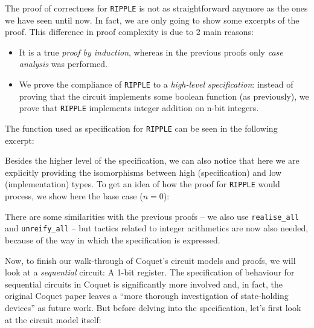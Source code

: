             The proof of correctness for \texttt{RIPPLE} is not as straightforward anymore as the
            ones we have seen until now. In fact, we are only going to show some excerpts of the
            proof. This difference in proof complexity is due to 2 main reasons:

            \begin{itemize}
                \item It is a true \emph{proof by induction}, whereas in the previous proofs only
                    \emph{case analysis} was performed.
                \item We prove the compliance of \texttt{RIPPLE} to a \emph{high-level
                        specification}: instead of proving that the circuit implements some boolean
                    function (as previously), we prove that \texttt{RIPPLE} implements integer
                    addition on n-bit integers.
            \end{itemize}

            The function used as specification for \texttt{RIPPLE} can be seen in the following
            excerpt:


            Besides the higher level of the specification, we can also notice that here we are
            explicitly providing the isomorphisms between high (specification) and low
            (implementation) types. To get an idea of how the proof for \texttt{RIPPLE} would
            process, we show here the base case ($n = 0$):


            There are some similarities with the previous proofs -- we also use
            \texttt{realise\_all} and \texttt{unreify\_all} -- but tactics related to integer
            arithmetics are now also needed, because of the way in which the specification is
            expressed.

            Now, to finish our walk-through of Coquet's circuit models and proofs, we will look at a
            \emph{sequential} circuit: A 1-bit register. The specification of behaviour for
            sequential circuits in Coquet is significantly more involved and, in fact, the original
            Coquet paper\cite{coquet2011} leaves a ``more thorough investigation of state-holding
            devices'' as future work. But before delving into the specification, let's first look
            at the circuit model itself:

